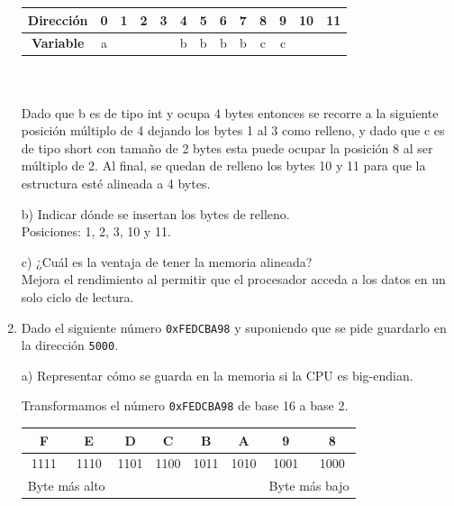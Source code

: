 \documentclass[a4paper, 11pt]{article}
\newcommand{\Pspace}{0.5cm}
\newcommand{\Aspace}{0.2cm}
\begin{document}
\begin{enumerate}
{                \begin{tabular}{|c|c|c|c|c|c|c|c|c|c|c|c|c|}
                    \hline
                    \textbf{Dirección} & 0 & 1 & 2 & 3 & 4 & 5 & 6 & 7 & 8 & 9 & 10 & 11 \\
                    \hline
                    \textbf{Variable} & a &  &  &  & b & b & b & b & c & c &  & \\ 
                    \hline
                \end{tabular} \\\\ 
                Dado que b es de tipo int y ocupa 4 bytes entonces se recorre a la siguiente posición múltiplo de 4 dejando los bytes 1 al 3 como relleno, y dado que c es de tipo short con tamaño de 2 bytes esta puede ocupar la posición 8 al ser múltiplo de 2. Al final, se quedan de relleno los bytes 10 y 11 para que la estructura esté alineada a 4 bytes.
        }

        \vspace{\Aspace} \par
        b) Indicar dónde se insertan los bytes de relleno.
        \\ { \color{azul} Posiciones: 1, 2, 3, 10 y 11. }

        \vspace{\Aspace} \par
        c) ¿Cuál es la ventaja de tener la memoria alineada?
        \\ { \color{azul} Mejora el rendimiento al permitir que el procesador acceda a los datos en un solo ciclo de lectura. }



    \vspace{\Pspace}
    \item Dado el siguiente número \texttt{0xFEDCBA98} y suponiendo que se pide guardarlo en la dirección \texttt{5000}. \par
        \vspace{\Aspace} \par
        a) Representar cómo se guarda en la memoria si la CPU es big-endian.
        \\ { \color{azul} 
                Transformamos el número \texttt{0xFEDCBA98} de base 16 a base 2. \\ 
                \begin{tabular}{|c|c|c|c|c|c|c|c|}
                    \hline
                    \textbf{F} & \textbf{E} & \textbf{D} & \textbf{C} & \textbf{B} & \textbf{A} & \textbf{9} & \textbf{8} \\
                    \hline
                    1111 & 1110 & 1101 & 1100 & 1011 & 1010 & 1001 & 1000 \\
                    \hline
                    \multicolumn{2}{|c|}{Byte más alto} & \multicolumn{4}{c}{} & \multicolumn{2}{|c|}{Byte más bajo} \\
                    \hline
                \end{tabular} \\

}
\end{enumerate}
\end{document}
